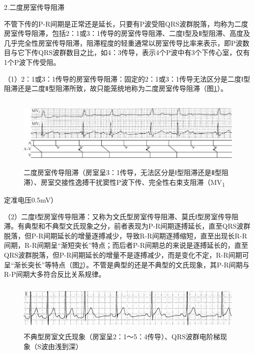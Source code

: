 2.二度房室传导阻滞

不管下传的P-R间期是正常还是延长，只要有P波受阻QRS波群脱落，均称为二度房室传导阻滞，包括2：1或3：1传导的房室传导阻滞、二度Ⅰ型及Ⅱ型阻滞、高度及几乎完全性房室传导阻滞，阻滞程度的轻重通常以房室传导比率来表示，即P波数目与它下传QRS波群数目之比，如4：3传导，表示4个P波中有3个下传心室，仅有1个P波下传受阻。

（1）2：1或3：1传导的房室传导阻滞：固定的2：1或3：1传导无法区分是二度Ⅰ型阻滞还是二度Ⅱ型阻滞所致，故只能笼统地称为二度房室传导阻滞（图\ref{fig20-5}）。

\begin{figure}[!htbp]
 \centering
 \includegraphics[width=5.79167in,height=1.38542in]{./images/Image00334.jpg}
 \captionsetup{justification=centering}
 \caption{二度房室传导阻滞（房室呈3：1传导，无法区分是Ⅰ型阻滞还是Ⅱ型阻滞）、房室交接性逸搏干扰窦性P波下传、完全性右束支阻滞（MV\textsubscript{1}}
 \label{fig20-5}
  \end{figure} 
定准电压0.5mV）

（2）二度Ⅰ型房室传导阻滞：又称为文氏型房室传导阻滞、莫氏Ⅰ型房室传导阻滞。有典型和不典型文氏现象之分，前者表现为P-R间期逐搏延长，直至QRS波群脱落，但P-R间期延长的增量逐搏减少，导致R-R间期逐搏缩短，直至出现长R-R间期，R-R间期呈“渐短突长”特点；而后者P-R间期总的来说是逐搏延长的，直至QRS波群脱落，但P-R间期延长的增量不是逐搏减少，而是变化不定，R-R间期可呈“渐长突长”等特点（图\ref{fig20-6}）。不管是典型的还是不典型的文氏现象，其P-R间期与R-P间期大多符合反比关系规律。

\begin{figure}[!htbp]
 \centering
 \includegraphics[width=5.58333in,height=0.92708in]{./images/Image00335.jpg}
 \captionsetup{justification=centering}
 \caption{不典型房室文氏现象（房室呈2：1～5：4传导）、QRS波群电阶梯现象（S波由浅到深）}
 \label{fig20-6}
  \end{figure} 

